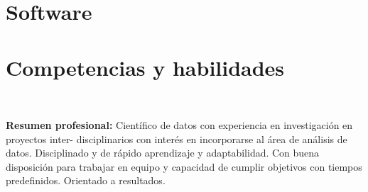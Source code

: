 \documentclass[]{friggeri-cv}
\begin{document}
\begin{aside}
  \section{Software}
\vspace{0.5cm}
  \section{Competencias y habilidades}
    ~
\end{aside}
\textbf{Resumen profesional:}
Científico de datos con experiencia en investigación en proyectos inter- disciplinarios con interés en incorporarse al área de análisis de datos. Disciplinado y de rápido aprendizaje y adaptabilidad. Con buena disposición para trabajar en equipo y  capacidad de cumplir objetivos con tiempos predefinidos. Orientado a resultados. 
\vspace{-0.4cm}
\end{document}
